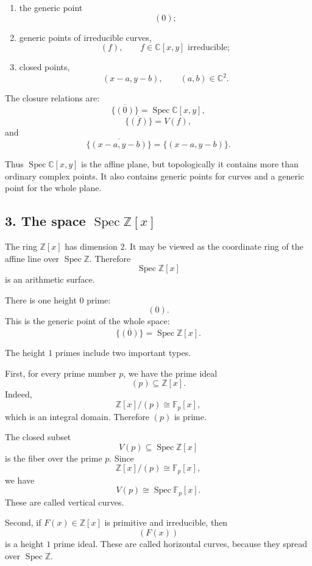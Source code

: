 	\begin{enumerate}[label=\arabic*)]
		\item the generic point
		\[
		(0);
		\]
		
		\item generic points of irreducible curves,
		\[
		(f),
		\qquad f\in\mathbb C[x,y]\text{ irreducible};
		\]
		
		\item closed points,
		\[
		(x-a,y-b),
		\qquad (a,b)\in\mathbb C^2.
		\]
	\end{enumerate}
	
	The closure relations are:
	\[
	\overline{\{(0)\}}=\operatorname{Spec}\mathbb C[x,y],
	\]
	\[
	\overline{\{(f)\}}=V(f),
	\]
	and
	\[
	\overline{\{(x-a,y-b)\}}=\{(x-a,y-b)\}.
	\]
	
	Thus \(\operatorname{Spec}\mathbb C[x,y]\) is the affine plane, but topologically it contains
	more than ordinary complex points. It also contains generic points for curves
	and a generic point for the whole plane.
	
	\subsection*{3. The space \(\operatorname{Spec} \mathbb Z[x]\)}
	
	The ring \(\mathbb Z[x]\) has dimension \(2\). It may be viewed as the coordinate
	ring of the affine line over \(\operatorname{Spec}\mathbb Z\). Therefore
	\[
	\operatorname{Spec}\mathbb Z[x]
	\]
	is an arithmetic surface.
	
	There is one height \(0\) prime:
	\[
	(0).
	\]
	This is the generic point of the whole space:
	\[
	\overline{\{(0)\}}=\operatorname{Spec}\mathbb Z[x].
	\]
	
	The height \(1\) primes include two important types.
	
	First, for every prime number \(p\), we have the prime ideal
	\[
	(p)\subseteq \mathbb Z[x].
	\]
	Indeed,
	\[
	\mathbb Z[x]/(p)\cong \mathbb F_p[x],
	\]
	which is an integral domain. Therefore \((p)\) is prime.
	
	The closed subset
	\[
	V(p)\subseteq \operatorname{Spec}\mathbb Z[x]
	\]
	is the fiber over the prime \(p\). Since
	\[
	\mathbb Z[x]/(p)\cong \mathbb F_p[x],
	\]
	we have
	\[
	V(p)\cong \operatorname{Spec} \mathbb F_p[x].
	\]
	These are called vertical curves.
	
	Second, if \(F(x)\in \mathbb Z[x]\) is primitive and irreducible, then
	\[
	(F(x))
	\]
	is a height \(1\) prime ideal. These are called horizontal curves, because they
	spread over \(\operatorname{Spec}\mathbb Z\).
	
